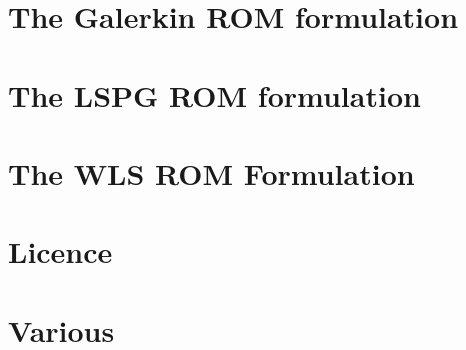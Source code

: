 \let\mypdfximage\pdfximage\def\pdfximage{\immediate\mypdfximage}\documentclass[twoside]{book}
\newcommand{\+}{\discretionary{\mbox{\scriptsize$\hookleftarrow$}}{}{}}
\newcommand{\clearemptydoublepage}{%
  \newpage{\pagestyle{empty}\cleardoublepage}%
}
\begin{document}
\chapter{The Galerkin ROM formulation}
\label{md_pages_revise_and_pick_various_formulation_galerkin}

\chapter{The LSPG ROM formulation}
\label{md_pages_revise_and_pick_various_formulation_lspg}

\chapter{The WLS ROM Formulation}
\label{md_pages_revise_and_pick_various_formulation_wls}

\chapter{Licence}
\label{md_pages_revise_and_pick_various_license}

\chapter{Various}
\label{md_pages_revise_and_pick_various}


\backmatter
\newpage
{}
\clearemptydoublepage
{}
\printindex
\end{document}
